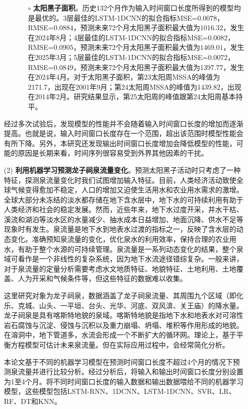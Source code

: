 \begin{enumerate}
\begin{itemize}
\begin{itemize}
      \item[$\circ$] \textbf{太阳黑子面积}。历史132个月作为输入时间窗口长度所得到的模型均是最优的。3层最佳的LSTM-1DCNN的拟合指标MSE=$0.0078$，RMSE=$0.0884$，预测未来72个月太阳黑子面积最大值为$1016.32$，发生在2024年8月；4层最佳的LSTM-1DCNN的拟合指标MSE=$0.0082$，RMSE=$0.0905$，预测未来72个月太阳黑子面积最大值为$1469.01$，发生在2025年3月；5层最佳的LSTM-1DCNN的拟合指标MSE=$0.0072$，RMSE=$0.0849$，预测未来72个月太阳黑子面积最大值为$1397.77$，发生在2024年4月。对于太阳黑子面积，第23太阳周MSSA的峰值为2171.7，出现在2001年9月；第24太阳周MSSA的峰值为1439.82，出现在2014年2月。研究结果显示，第25太阳周的峰值跟第24太阳周基本持平。 
    \end{itemize}
  \end{itemize}

  经过多次试验后，发现模型的性能并不会随着输入时间窗口长度的增加而逐渐提高。也就是说，输入时间窗口长度存在一个范围，超出该范围时模型性能会有所下降。另外，本研究还发现输出时间窗口长度增加会降低模型的性能，可能的原因是长期来看，时间序列很容易受到外界其他因素的干扰。

  \item[(2)] \textbf{利用机器学习预测龙子祠泉流量变化}。预测太阳黑子活动时只考虑了一种特征，探测泉流量变化时我们试图增加输入特征。目前，人类经济活动致使全球气候变得愈加不稳定，人口的增加又迫使生活用水和农业用水需求的激增。全球大部分未冻结的淡水都存储在地下含水层中，地下水的可持续利用有助于人类经济和社会的稳定发展。然而，近些年来，地下水过度开采，井水干枯、溪流和湖泊等淡水区的水量减少、抽水成本日益增加、地面沉降、供水不足等现象时有发生。泉流量是地下水到地表水过渡的指标之一，反映了含水层的动态变化。准确预知泉流量的变化，优化泉水的利用效率，保持合理的农业用水，有助于整个水源的可持续管理。泉流量是一系列动态变化的结果，整个泉域可看作是一个非线性的复杂系统，因为地下水流途径错综复杂。一般来讲，对于泉流量的定量分析需要考虑水文地质特征、地貌特征、土地利用、土地覆盖、人为开采和气候条件等，但这些特征的数据难以收集。
  
  这里研究对象为龙子祠泉，数据涵盖了龙子祠泉流量、其周围九个区域（即化乐、克城、山头、一平垣、台头、光华、河底、双风渰、关王庙）的降水量。龙子祠泉是具有喀斯特地貌的泉域。喀斯特地貌是指地下水和地表水对可溶性岩石腐蚀与沉淀、侵蚀与沉积以及重力崩塌、坍塌、堆积等作用形成的地貌。在溶洞中，地下管道多，水流会形成一个不断扩大的循环网。理论上，基于平衡方程模型可估计未来泉流量。但在实际应用过程中，会经常简化分析。
      
  本论文基于不同的机器学习模型在预测时间窗口长度不超过4个月的情况下预测泉流量并进行比较分析。经过分析后，将输入和输出时间窗口长度分别设置为1至4个月。将不同时间窗口长度的输入数据和输出数据喂给不同的机器学习模型，这些模型包括LSTM-RNN、1DCNN、LSTM-1DCNN、SVR、LR、RF、DT和KNN。
  

\end{enumerate}
